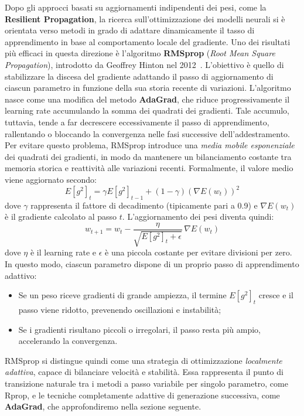 Dopo gli approcci basati su aggiornamenti indipendenti dei pesi, come la \textbf{Resilient Propagation}, la ricerca sull’ottimizzazione dei modelli neurali si è orientata verso metodi in grado di adattare dinamicamente il tasso di apprendimento in base al comportamento locale del gradiente. Uno dei risultati più efficaci in questa direzione è l’algoritmo \textbf{RMSprop} (\textit{Root Mean Square Propagation}), introdotto da Geoffrey Hinton nel 2012~\cite{TielemanHinton2012RMSprop}. L’obiettivo è quello di stabilizzare la discesa del gradiente adattando il passo di aggiornamento di ciascun parametro in funzione della sua storia recente di variazioni. L’algoritmo nasce come una modifica del metodo \textbf{AdaGrad}, che riduce progressivamente il learning rate accumulando la somma dei quadrati dei gradienti. Tale accumulo, tuttavia, tende a far decrescere eccessivamente il passo di apprendimento, rallentando o bloccando la convergenza nelle fasi successive dell’addestramento. Per evitare questo problema, RMSprop introduce una \textit{media mobile esponenziale} dei quadrati dei gradienti, in modo da mantenere un bilanciamento costante tra memoria storica e reattività alle variazioni recenti. Formalmente, il valore medio viene aggiornato secondo:
\[
E[g^2]_t = \gamma E[g^2]_{t-1} + (1 - \gamma) (\nabla E(w_t))^2
\]
dove $\gamma$ rappresenta il fattore di decadimento (tipicamente pari a 0.9) e $\nabla E(w_t)$ è il gradiente calcolato al passo $t$. L’aggiornamento dei pesi diventa quindi:
\[
w_{t+1} = w_t - \frac{\eta}{\sqrt{E[g^2]_t + \epsilon}} \, \nabla E(w_t)
\]
dove $\eta$ è il learning rate e $\epsilon$ è una piccola costante per evitare divisioni per zero. In questo modo, ciascun parametro dispone di un proprio passo di apprendimento adattivo:  
\begin{itemize}
    \item Se un peso riceve gradienti di grande ampiezza, il termine $E[g^2]_t$ cresce e il passo viene ridotto, prevenendo oscillazioni e instabilità;
    \item Se i gradienti risultano piccoli o irregolari, il passo resta più ampio, accelerando la convergenza.
\end{itemize}

RMSprop si distingue quindi come una strategia di ottimizzazione \textit{localmente adattiva}, capace di bilanciare velocità e stabilità. Essa rappresenta il punto di transizione naturale tra i metodi a passo variabile per singolo parametro, come Rprop, e le tecniche completamente adattive di generazione successiva, come \textbf{AdaGrad}, che approfondiremo nella sezione seguente.


